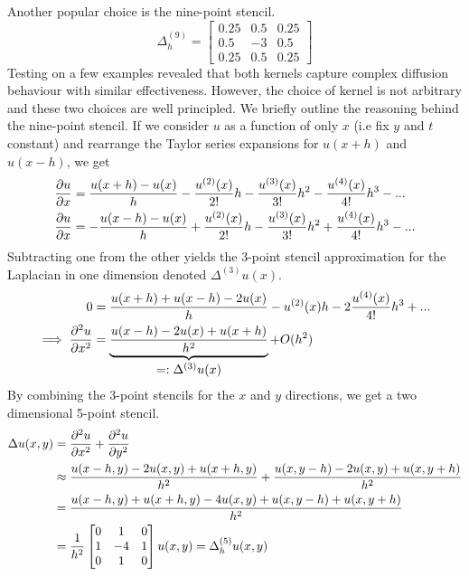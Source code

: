 Another popular choice is the nine-point stencil\cite{rosser1975nine}.
\begin{equation}
  \Delta^{(9)}_h = \begin{bmatrix}
    0.25 & 0.5 & 0.25\\
    0.5 & -3 & 0.5\\
    0.25 & 0.5 & 0.25
  \end{bmatrix}
\end{equation}
Testing on a few examples revealed that both kernels capture complex diffusion behaviour with similar effectiveness. However, the choice of kernel is not arbitrary and these two choices are well principled. We briefly outline the reasoning behind the nine-point stencil. If we consider $u$ as a function of only $x$ (i.e fix $y$ and $t$ constant) and rearrange the Taylor series expansions for $u(x+h)$ and $u(x-h)$, we get
\begin{align}
  \pdv{u}{x} &= \frac{u(x+h) - u(x)}{h} - \frac{u^{(2)}(x)}{2!}h - \frac{u^{(3)}(x)}{3!}h^2 - \frac{u^{(4)}(x)}{4!}h^3 - ... \\
  \pdv{u}{x} &= - \frac{u(x-h) - u(x)}{h} + \frac{u^{(2)}(x)}{2!}h - \frac{u^{(3)}(x)}{3!}h^2 + \frac{u^{(4)}(x)}{4!}h^3 - ...
\end{align}
Subtracting one from the other yields the 3-point stencil approximation for the Laplacian in one dimension denoted $\Delta^{(3)}u(x)$.
\begin{align}
  0 &= \frac{u(x+h) + u(x-h) - 2u(x)}{h} - u^{(2)}(x)h - 2\frac{u^{(4)}(x)}{4!}h^3 + ...\\
  \implies \pdv[order={2}]{u}{x} &=  \underbrace{\frac{u(x-h) -2u(x) + u(x+h)}{h^2}}_{\let\scriptstyle\textstyle
  \substack{=: \Delta^{(3)}u(x)}} + O(h^2)
\end{align}
By combining the 3-point stencils for the $x$ and $y$ directions, we get a two dimensional 5-point stencil.
\begin{align}
  \Delta u(x, y) &= \pdv[order={2}]{u}{x} + \pdv[order={2}]{u}{y}\\
                     &\approx \frac{u(x-h, y) -2u(x, y) + u(x+h, y)}{h^2} + \frac{u(x, y-h) -2u(x, y) + u(x, y+h)}{h^2}\\
                     &= \frac{u(x-h, y)+ u(x+h, y) -4u(x, y) + u(x, y-h) + u(x, y+h)}{h^2}\\
                     &= \frac{1}{h^2} \begin{bmatrix}
                                0 & 1 & 0\\
                                1 & -4 & 1\\
                                0 & 1 & 0
                     \end{bmatrix} u(x, y) = \Delta^{(5)}_h u(x, y) \label{eq:5-point-stencil}
\end{align}
